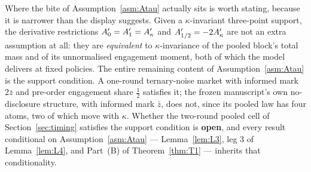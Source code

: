 Where the bite of Assumption~\ref{asm:Atau} actually sits is worth stating, because it is narrower
than the display suggests. Given a $\kappa$-invariant three-point support, the derivative
restrictions $A_0' = A_1' = A'_{\kappa}$ and $A_{1/2}' = -2A'_{\kappa}$ are not an extra assumption at all: they
are \emph{equivalent} to $\kappa$-invariance of the pooled block's total mass and of its
unnormalised engagement moment, both of which the model delivers at fixed policies. The entire
remaining content of Assumption~\ref{asm:Atau} is the support condition. A one-round ternary-noise
market with informed mark $2\bar z$ and pre-order engagement share $\tfrac12$ satisfies it; the
frozen manuscript's own no-disclosure structure, with informed mark $\bar z$, does not, since its
pooled law has four atoms, two of which move with $\kappa$. Whether the two-round pooled cell of
Section~\ref{sec:timing} satisfies the support condition is \textbf{open}, and every result
conditional on Assumption~\ref{asm:Atau} --- Lemma~\ref{lem:L3}, leg 3 of Lemma~\ref{lem:L4}, and
Part~(B) of Theorem~\ref{thm:T1} --- inherits that conditionality.

